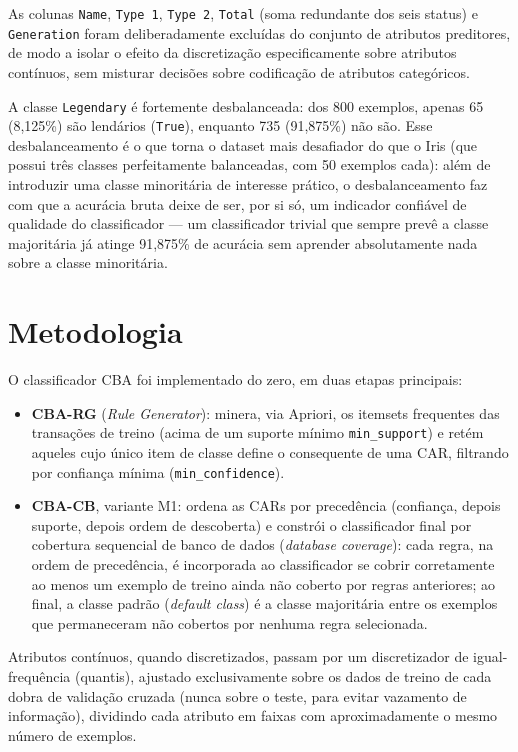 \documentclass[a4paper,11pt]{article}
\begin{document}
As colunas \texttt{Name}, \texttt{Type~1}, \texttt{Type~2}, \texttt{Total}
(soma redundante dos seis status) e \texttt{Generation} foram
deliberadamente excluídas do conjunto de atributos preditores, de modo a
isolar o efeito da discretização especificamente sobre atributos
contínuos, sem misturar decisões sobre codificação de atributos
categóricos.

A classe \texttt{Legendary} é fortemente desbalanceada: dos 800 exemplos,
apenas 65 (8,125\%) são lendários (\texttt{True}), enquanto 735 (91,875\%)
não são. Esse desbalanceamento é o que torna o dataset mais desafiador do
que o Iris (que possui três classes perfeitamente balanceadas, com 50
exemplos cada): além de introduzir uma classe minoritária de interesse
prático, o desbalanceamento faz com que a acurácia bruta deixe de ser, por
si só, um indicador confiável de qualidade do classificador — um
classificador trivial que sempre prevê a classe majoritária já atinge
91,875\% de acurácia sem aprender absolutamente nada sobre a classe
minoritária.

\section{Metodologia}

O classificador CBA foi implementado do zero, em duas etapas principais:

\begin{itemize}
    \item \textbf{CBA-RG} (\emph{Rule Generator}): minera, via Apriori, os
    itemsets frequentes das transações de treino (acima de um suporte
    mínimo \texttt{min\_support}) e retém aqueles cujo único item de classe
    define o consequente de uma CAR, filtrando por confiança mínima
    (\texttt{min\_confidence}).
    \item \textbf{CBA-CB}, variante M1: ordena as CARs por precedência
    (confiança, depois suporte, depois ordem de descoberta) e constrói o
    classificador final por cobertura sequencial de banco de dados
    (\emph{database coverage}): cada regra, na ordem de precedência, é
    incorporada ao classificador se cobrir corretamente ao menos um
    exemplo de treino ainda não coberto por regras anteriores; ao final, a
    classe padrão (\emph{default class}) é a classe majoritária entre os
    exemplos que permaneceram não cobertos por nenhuma regra selecionada.
\end{itemize}

Atributos contínuos, quando discretizados, passam por um discretizador de
igual-frequência (quantis), ajustado exclusivamente sobre os dados de
treino de cada dobra de validação cruzada (nunca sobre o teste, para evitar
vazamento de informação), dividindo cada atributo em faixas com
aproximadamente o mesmo número de exemplos.
\end{document}
